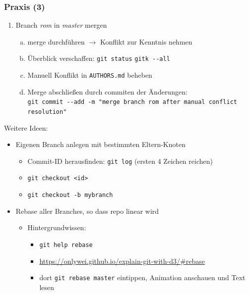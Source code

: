 \documentclass{beamer}
\begin{document}
\begin{frame}[fragile,label=uebung40]
\frametitle{Praxis (3)}
\begin{enumerate}
 \setcounter{enumi}{\value{taskcounter}}
 \item Branch \textit{rom} in \textit{master} mergen
 \begin{enumerate}[a)]
 \item merge durchführen $\rightarrow$ Konflikt zur Kenntnis nehmen
 \item Überblick verschaffen: \verb|git status|  \verb|gitk --all|
 \item Manuell Konflikt in \verb|AUTHORS.md| beheben
 \item Merge abschließen durch commiten der Änderungen:\\
 {\tiny \verb|git commit --add -m "merge branch rom after manual conflict resolution"|}
 \end{enumerate}

 \setcounter{taskcounter}{\value{enumi}}
\end{enumerate}

Weitere Ideen:
\begin{itemize}
 \item Eigenen Branch anlegen mit bestimmten Eltern-Knoten
 \begin{itemize}
  \item Commit-ID herausfinden: \verb|git log| (ersten 4 Zeichen reichen)
  \item \verb|git checkout <id>|
  \item \verb|git checkout -b mybranch|
 \end{itemize}
 \item Rebase aller Branches, so dass repo linear wird
 \begin{itemize}
  \item Hintergrundwissen:
  \begin{itemize}
   \item  \verb|git help rebase|
\item \url{https://onlywei.github.io/explain-git-with-d3/#rebase}
  \item dort \verb|git rebase master| eintippen, Animation anschauen und Text lesen
  \end{itemize}
 \end{itemize}

\end{itemize}

\end{frame}

\end{document}
